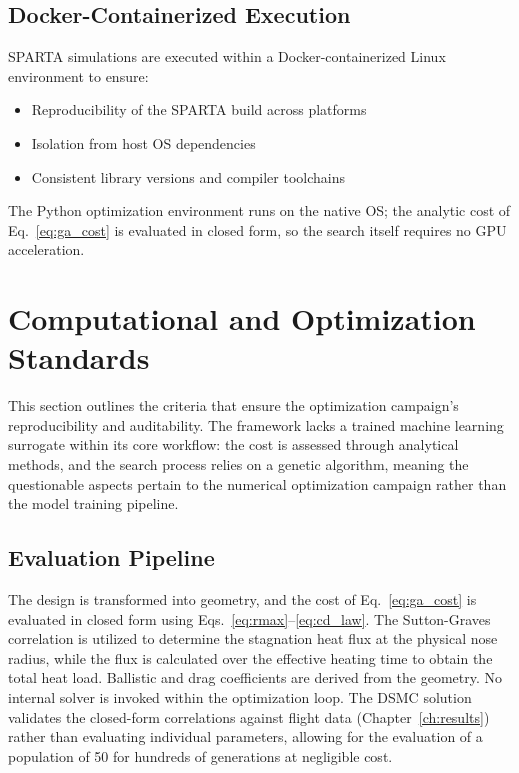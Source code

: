 \subsection{Docker-Containerized Execution}
SPARTA simulations are executed within a Docker-containerized Linux environment to ensure:
\begin{itemize}
    \item Reproducibility of the SPARTA build across platforms

    \item Isolation from host OS dependencies

    \item Consistent library versions and compiler toolchains
\end{itemize}

The Python optimization environment runs on the native OS; the analytic cost of Eq.~\eqref{eq:ga_cost} is evaluated in closed form, so the search itself requires no GPU acceleration.

\section{Computational and Optimization Standards}
\label{sec:comp_standards}

This section outlines the criteria that ensure the optimization campaign's reproducibility and auditability. The framework lacks a trained machine learning surrogate within its core workflow: the cost is assessed through analytical methods, and the search process relies on a genetic algorithm, meaning the questionable aspects pertain to the numerical optimization campaign rather than the model training pipeline.

\subsection{Evaluation Pipeline}
The design is transformed into geometry, and the cost of Eq.~\eqref{eq:ga_cost} is evaluated in closed form using Eqs.~\eqref{eq:rmax}--\eqref{eq:cd_law}. The Sutton-Graves correlation is utilized to determine the stagnation heat flux at the physical nose radius, while the flux is calculated over the effective heating time to obtain the total heat load. Ballistic and drag coefficients are derived from the geometry. No internal solver is invoked within the optimization loop. The DSMC solution validates the closed-form correlations against flight data (Chapter~\ref{ch:results}) rather than evaluating individual parameters, allowing for the evaluation of a population of 50 for hundreds of generations at negligible cost.

